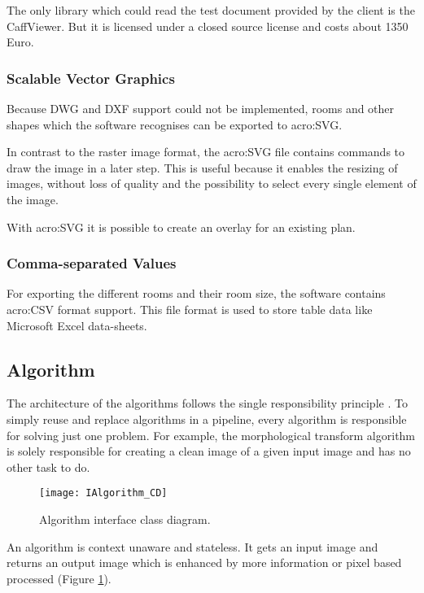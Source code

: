 The only library which could read the test document provided by the client is the CaffViewer. But it is licensed under a closed source license and costs about 1350 Euro.

\subsubsection{Scalable Vector Graphics}
Because DWG and DXF support could not be implemented, rooms and other shapes which the software recognises can be exported to \gls{acro:SVG}.

In contrast to the raster image format, the \gls{acro:SVG} file contains commands to draw the image in a later step. This is useful because it enables the resizing of images, without loss of quality and the possibility to select every single element of the image.

With \gls{acro:SVG} it is possible to create an overlay for an existing plan.

\subsubsection{Comma-separated Values}
For exporting the different rooms and their room size, the software contains \gls{acro:CSV} format support. This file format is used to store table data like Microsoft Excel data-sheets.

\pagebreak
\subsection{Algorithm}
The architecture of the algorithms follows the single responsibility principle \citep[p.~484]{mclaughlin_pollice_west_2010}. To simply reuse and replace algorithms in a pipeline, every algorithm is responsible for solving just one problem. For example, the morphological transform algorithm is solely responsible for creating a clean image of a given input image and has no other task to do.

\begin{figure}[h]
  \centering
      \texttt{[image: IAlgorithm\_CD]}
  \caption{Algorithm interface class diagram.}
  \label{fig:IAlgorithm_CD}
\end{figure}

An algorithm is context unaware and stateless. It gets an input image and returns an output image which is enhanced by more information or pixel based processed (Figure \ref{fig:IAlgorithm_CD}).

